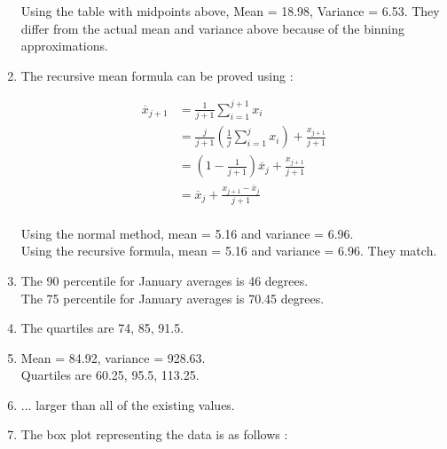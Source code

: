 \begin{enumerate}
	Using the table with midpoints above, Mean = 18.98, Variance = 6.53. They differ from the actual mean and variance above because of the binning approximations.
	
	\item The recursive mean formula can be proved using : 
	
	
		\begin{align}
			\overline{x}_{j + 1} &= \frac{1}{j + 1} \sum\limits_{i = 1}^{j + 1} x_{i} \\
			& = \frac{j}{j + 1} \left( \frac{1}{j} \sum\limits_{i = 1}^{j} x_{i} \right) + \frac{x_{j + 1}}{j + 1} \\
			& = \left( 1 - \frac{1}{j + 1} \right) \overline{x}_{j} + \frac{x_{j + 1}}{j + 1} \\
			& = \overline{x}_{j} + \frac{x_{j + 1} - \overline{x}_{j}}{j + 1}
		\end{align}
	 \\
	
	Using the normal method, mean = 5.16 and variance = 6.96. \\
	Using the recursive formula, mean = 5.16 and variance = 6.96. They match. \\
	
	\item The 90 percentile for January averages is 46 degrees. \\
	The 75 percentile for January averages is 70.45 degrees.
	
	\item The quartiles are 74, 85, 91.5.\\
	
	\item Mean = 84.92, variance = 928.63. \\
	Quartiles are 60.25, 95.5, 113.25. \\
	
	\item ... larger than all of the existing values. \\
	
	\item The box plot representing the data is as follows : \\
	
	\begin{figure}[H]
		\centering
	\end{figure}
	

\end{enumerate}
